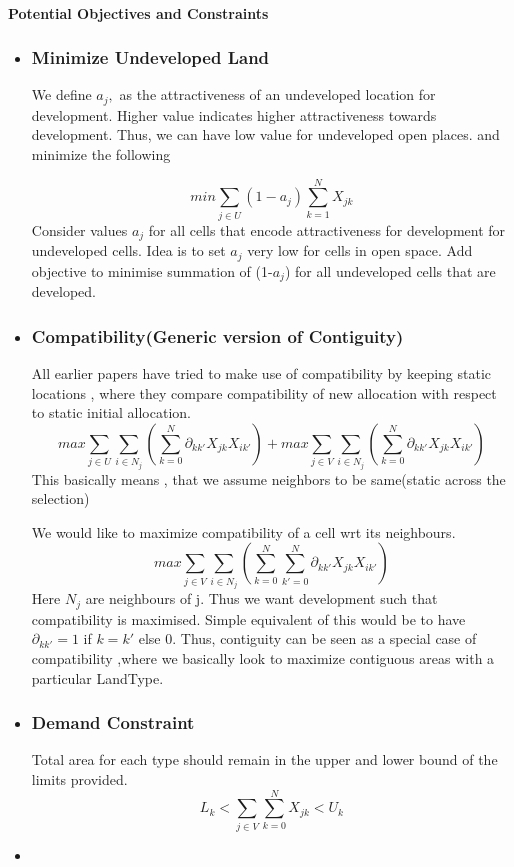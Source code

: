 \documentclass[12pt]{article} %
\begin{document}
\paragraph{Potential Objectives and Constraints}
\begin{itemize}
\item
\subsubsection*{Minimize Undeveloped Land}

We define $ a_{j},$ as the attractiveness of an undeveloped location for development. Higher value indicates higher attractiveness towards development.  Thus, we can have low value for undeveloped open places. and minimize the following

 $$
 min\sum_{j \in U} (1-a_j) \sum_{k=1}^N X_{jk}
 $$
Consider values $a_j$  for all cells that encode attractiveness for development for undeveloped cells. Idea is to set $a_j$ very low for cells in open space. Add objective to minimise summation of (1-$a_j$) for all undeveloped cells that are developed. 

\item 
\subsubsection*{ Compatibility(Generic  version of Contiguity)}
All earlier papers have tried to make use of compatibility by keeping static locations , where they compare compatibility of new allocation with respect to static initial allocation.
 $$
max \sum_{j \in U} \sum_{i \in N_j}(\sum_{k=0}^{N}\partial_{kk'} X_{jk} X_{ik'})
 +max \sum_{j \in V} \sum_{i \in N_j}(\sum_{k=0}^{N}\partial_{kk'} X_{jk} X_{ik'})
 $$
 This basically means , that we assume neighbors to be same(static across the selection) 

We would like to maximize compatibility of a cell wrt its neighbours.
$$
max \sum_{j \in V}  \sum_{i \in N_j}(\sum_{k=0}^{N}\sum_{k'=0}^{N}\partial_{kk'} X_{jk} X_{ik'})
 $$
Here $N_j $ are neighbours of j. Thus we want development such that compatibility is maximised. Simple equivalent of this would be to have $\partial_{kk'} = 1 $ if  $k =k'$ else $0$. Thus, contiguity can be seen as a special case of compatibility ,where we basically look to maximize contiguous areas with  a particular LandType.

\item
\subsubsection*{Demand Constraint  }
 Total area for each type should remain in the upper and lower bound of the limits provided.
$$ L_k < \sum_{j \in V} \sum_{k=0}^N X_{jk} < U_k $$
\item


\end{itemize}
\end{document}
